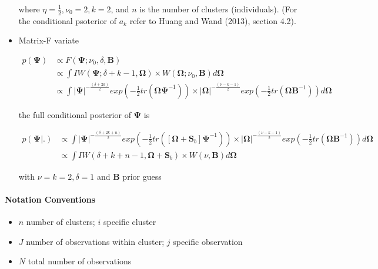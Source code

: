 \documentclass[a4paper]{article}
\begin{document}
\begin{itemize}
where $\eta = \frac{1}{2}, \nu_0 = 2, k = 2$, and $n$ is the number of clusters (individuals). (For the conditional psoterior of $a_k$ refer to Huang and Wand (2013), section 4.2).
	
	\item Matrix-F variate
	
\begin{equation*}
 \begin{split} 
  p(\bm{\Psi})& \propto F(\bm{\Psi}; \nu_0, \delta, \bm{B}) \\
  & \propto \int IW(\bm{\Psi}; \delta + k - 1, \bm{\Omega}) \times W(\bm{\Omega}; \nu_0, \bm{B})d\bm{\Omega} \\
  & \propto \int |\bm{\Psi}|^{-\frac{(\delta+2k)}{2}}exp\left(-\frac{1}{2}tr(\bm{\Omega}\bm{\Psi}^{-1})\right) \times |\bm{\Omega}|^{-\frac{(\nu-k-1)}{2}}exp\left(-\frac{1}{2}tr(\bm{\Omega}\bm{B}^{-1})\right)d\bm{\Omega}
 \end{split}
\end{equation*}	

the full conditional posterior of $\bm{\Psi}$ is

\begin{equation}
 \begin{split} 
  p(\bm{\Psi}|.)& \propto \int |\bm{\Psi}|^{-\frac{(\delta+2k+n)}{2}}exp\left(-\frac{1}{2}tr([\bm{\Omega}+\bm{S}_b]\bm{\Psi}^{-1})\right) \times |\bm{\Omega}|^{-\frac{(\nu-k-1)}{2}}exp\left(-\frac{1}{2}tr(\bm{\Omega}\bm{B}^{-1})\right)d\bm{\Omega} \\
  & \propto \int IW(\delta+k+n-1, \bm{\Omega} + \bm{S}_{b}) \times W(\nu, \bm{B})d\bm{\Omega}
 \end{split}
\end{equation}			

with $\nu = k = 2, \delta = 1$ and $\bm{B}$ prior guess
	
\end{itemize}

\paragraph{Notation Conventions}

\begin{itemize}
	\item $n$ number of clusters; $i$ specific cluster
	\item $J$ number of observations within cluster; $j$ specific observation
	\item $N$ total number of observations
\end{itemize}
\end{document}
